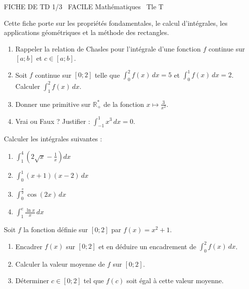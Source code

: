 \documentclass[11pt]{article}
\begin{document}
\begin{tcolorbox}[enhanced,colback=popink,colframe=popink,arc=10pt,boxrule=0pt,left=12pt,right=12pt,top=9pt,bottom=9pt]
{\color{white}\popxbold\small FICHE DE TD 1/3 \textbullet\ FACILE \hfill Mathématiques \textbullet\ Tle T\par}
\end{tcolorbox}
\vspace{4pt}
Cette fiche porte sur les propriétés fondamentales, le calcul d'intégrales, les applications géométriques et la méthode des rectangles.

\begin{exercice}
\begin{enumerate}
    \item Rappeler la relation de Chasles pour l'intégrale d'une fonction $f$ continue sur $[a;b]$ et $c \in [a;b]$.
    \item Soit $f$ continue sur $[0;2]$ telle que $\int_{0}^{2} f(x) \, dx = 5$ et $\int_{0}^{1} f(x) \, dx = 2$. Calculer $\int_{1}^{2} f(x) \, dx$.
    \item Donner une primitive sur $\mathbb{R}^*_+$ de la fonction $x \mapsto \frac{3}{x^2}$.
    \item Vrai ou Faux ? Justifier : $\int_{-1}^{1} x^3 \, dx = 0$.
\end{enumerate}
\end{exercice}

\begin{exercice}
Calculer les intégrales suivantes :
\begin{enumerate}
    \item $\displaystyle \int_{1}^{4} \left( 2\sqrt{x} - \frac{1}{x} \right) dx$
    \item $\displaystyle \int_{0}^{1} (x+1)(x-2) \, dx$
    \item $\displaystyle \int_{0}^{\frac{\pi}{2}} \cos(2x) \, dx$
    \item $\displaystyle \int_{1}^{e} \frac{\ln x}{x} \, dx$
\end{enumerate}
\end{exercice}

\begin{exercice}
Soit $f$ la fonction définie sur $[0;2]$ par $f(x) = x^2 + 1$.
\begin{enumerate}
    \item Encadrer $f(x)$ sur $[0;2]$ et en déduire un encadrement de $\int_{0}^{2} f(x) \, dx$.
    \item Calculer la valeur moyenne de $f$ sur $[0;2]$.
    \item Déterminer $c \in [0;2]$ tel que $f(c)$ soit égal à cette valeur moyenne.
\end{enumerate}
\end{exercice}
\end{document}
